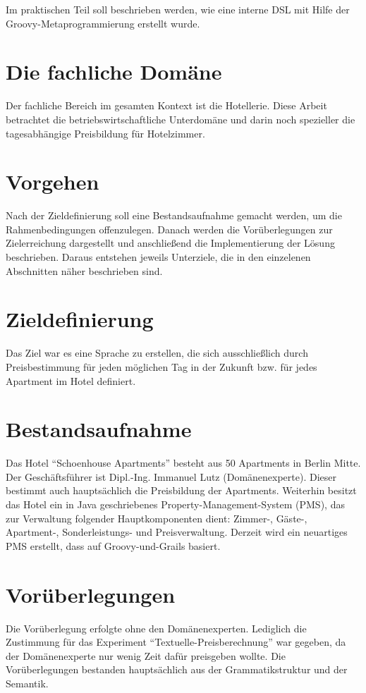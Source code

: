 \documentclass[11pt,english,ngerman, headsepline]{scrreprt}
\begin{document}
Im praktischen Teil soll beschrieben werden, wie eine interne DSL mit Hilfe der
Groovy-Metaprogrammierung erstellt wurde.

\section{Die fachliche Domäne}
Der fachliche Bereich im gesamten Kontext ist die Hotellerie. Diese
Arbeit betrachtet die betriebswirtschaftliche Unterdomäne
 und darin noch spezieller die tagesabhängige Preisbildung für Hotelzimmer.

\section{Vorgehen}
Nach der Zieldefinierung soll eine Bestandsaufnahme gemacht werden, um die
Rahmenbedingungen offenzulegen. Danach werden die
Vorüberlegungen zur Zielerreichung dargestellt und anschließend die
Implementierung der Lösung beschrieben. Daraus entstehen jeweils Unterziele, die
in den einzelenen Abschnitten näher beschrieben sind. 

\section{Zieldefinierung}
Das Ziel war es eine Sprache zu erstellen, die sich ausschließlich durch
Preisbestimmung für jeden möglichen Tag in der Zukunft bzw. für jedes Apartment
im Hotel definiert.

\section{Bestandsaufnahme}
 Das Hotel
``Schoenhouse Apartments'' besteht aus 50 Apartments in Berlin Mitte. Der
Geschäftsführer ist Dipl.-Ing. Immanuel Lutz (Domänenexperte). Dieser bestimmt
auch hauptsächlich die Preisbildung der Apartments. Weiterhin besitzt das Hotel ein in Java
geschriebenes Property-Management-System (PMS), das zur Verwaltung folgender
Hauptkomponenten dient: Zimmer-, Gäste-, Apartment-, Sonderleistungs- und
Preisverwaltung.
Derzeit wird ein neuartiges PMS erstellt, dass auf Groovy-und-Grails basiert.
 
 \section{Vorüberlegungen}

Die Vorüberlegung erfolgte ohne den Domänenexperten. Lediglich die Zustimmung
für das Experiment ``Textuelle-Preisberechnung'' war gegeben, da der
Domänenexperte nur wenig Zeit dafür preisgeben wollte. Die Vorüberlegungen
bestanden hauptsächlich aus der Grammatikstruktur und der Semantik. 
\end{document}
